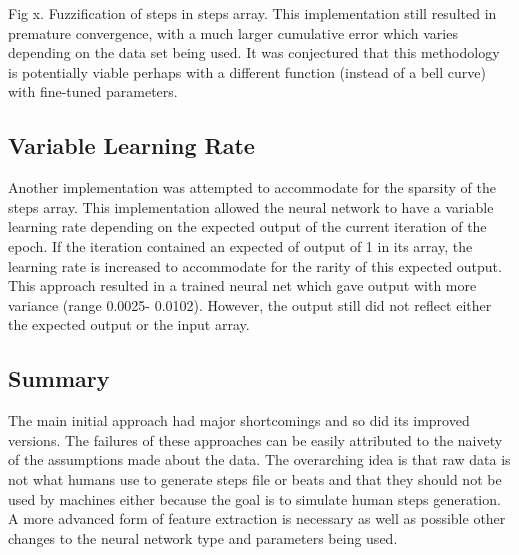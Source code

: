 Fig x. Fuzzification of steps in steps array.
This implementation still resulted in premature convergence, with a much larger cumulative error which varies depending on the data set being used. It was conjectured that this methodology is potentially viable perhaps with a different function (instead of a bell curve) with fine-tuned parameters.\\

\subsection{Variable Learning Rate}
Another implementation was attempted to accommodate for the sparsity of the steps array. This implementation allowed the neural network to have a variable learning rate depending on the expected output of the current iteration of the epoch. If the iteration contained an expected of output of 1 in its array, the learning rate is increased to accommodate for the rarity of this expected output. This approach resulted in a trained neural net which gave output with more variance (range 0.0025- 0.0102). However, the output still did not reflect either the expected output or the input array.\\

\subsection{Summary}
The main initial approach had major shortcomings and so did its improved versions. The failures of these approaches can be easily attributed to the naivety of the assumptions made about the data. The overarching idea is that raw data is not what humans use to generate steps file or beats and that they should not be used by machines either because the goal is to simulate human steps generation. A more advanced form of feature extraction is necessary as well as possible other changes to the neural network type and parameters being used.